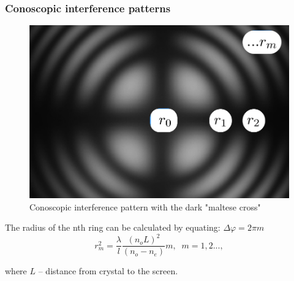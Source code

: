 \documentclass{beamer}
\begin{document}
	\begin{frame}
		\frametitle{Conoscopic interference patterns}
		
		\begin{figure}
			\centering
			\includegraphics[width=0.5\linewidth]{res/pattern}
			\caption{Conoscopic interference pattern with the dark "maltese cross"}
		\end{figure}
		
		\footnotesize
		The radius of the nth ring can be calculated by equating: $\Delta \varphi = 2 \pi m$
		$$r^2_m = \frac{\lambda}{l} \frac{(n_o L)^2}{(n_o - n_e)} m,\;\; m = 1,2...,$$
		
		where $L$ -- distance from crystal to the screen.
	\end{frame}
\end{document}

